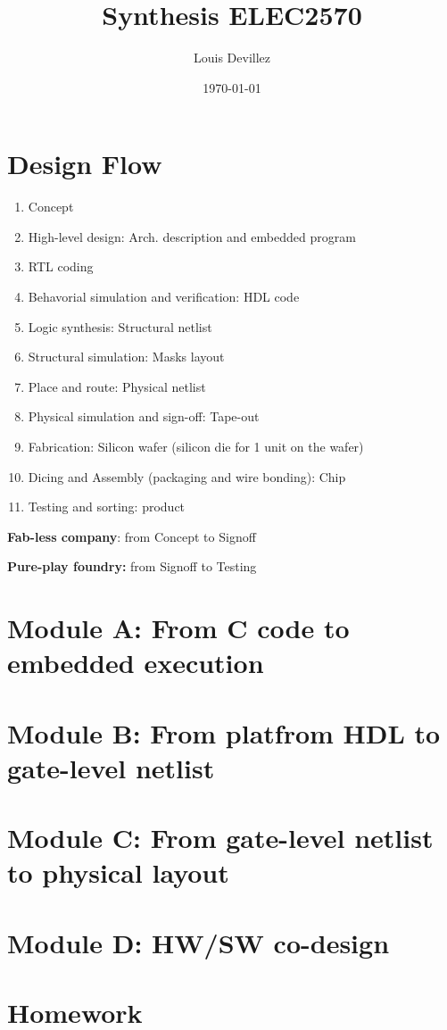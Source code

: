 


\title{Synthesis ELEC2570}
\author{Louis Devillez}
\date{\today}



\maketitle

\tableofcontents
\section{Design Flow}
\begin{enumerate}
  \item Concept
  \item High-level design: Arch. description and embedded program
  \item RTL coding
  \item Behavorial simulation and verification: HDL code
  \item Logic synthesis: Structural netlist
  \item Structural simulation: Masks layout
  \item Place and route: Physical netlist
  \item Physical simulation and sign-off: Tape-out
  \item Fabrication: Silicon wafer (silicon die for 1 unit on the wafer)
  \item Dicing and Assembly (packaging and wire bonding): Chip
  \item Testing and sorting: product
\end{enumerate}

\textbf{Fab-less company}: from Concept to Signoff

\textbf{Pure-play foundry:} from Signoff to Testing

\section{Module A: From C code to embedded execution}

\section{Module B: From platfrom HDL to gate-level netlist}


\section{Module C: From gate-level netlist to physical layout}

\section{Module D: HW/SW co-design}


\section{Homework}

